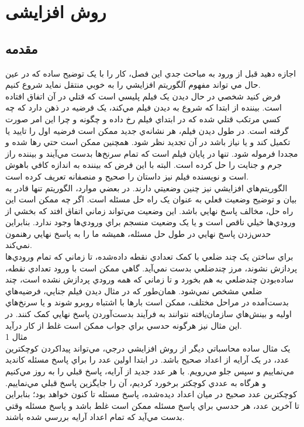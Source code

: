 \documentclass{book}
\begin{document}
\chapter{روش افزایشی
}

\section*{مقدمه}
	اجازه دهيد قبل از ورود به مباحث جدي اين فصل، کار را با يک توضيح ساده که در عين حال مي تواند مفهوم آلگوريتم افزايشي را به خوبي منتقل نمايد شروع کنيم.\\
	
	فرض کنيد شخصي در حال ديدن يک فيلم پليسي است که قتلي در آن اتفاق افتاده است. بيننده از ابتدا که شروع به ديدن فيلم مي‌کند، يک فرضيه در ذهن دارد که چه کسي مرتکب قتلي شده که در ابتداي فيلم رخ داده و چگونه و چرا اين امر صورت گرفته است. در طول ديدن فيلم، هر نشانه‌ي جديد ممکن است فرضيه اول را تاييد يا تکميل کند و يا نياز باشد در آن تجديد نظر شود. همچنين ممکن است حتي رها شده و مجددا فرموله شود. تنها در پايان فيلم است که تمام سرنخ‌ها بدست مي‌آيند و بيننده راز جرم و جنايت را حل کرده است. البته با اين فرض که بيننده به اندازه کافي باهوش است و نويسنده فيلم نيز  داستان را صحيح و منصفانه تعريف کرده است. \\
	
	الگوريتم‌هاي افزايشي نيز چنين وضعيتي دارند. در بعضي موارد، الگوريتم تنها قادر به بيان و توضيح وضعيت فعلي به عنوان يک راه حل مسئله است. اگر چه ممکن است اين راه حل، مخالف پاسخ نهايي باشد. اين وضعيت مي‌تواند زماني اتفاق افتد که بخشي از ورودي‌ها خيلي ناقص است و يا يک وضعيت منسجم براي ورودي‌ها وجود ندارد. بنابراين حدس‌زدن پاسخ نهايي در طول حل مسئله، هميشه ما را به پاسخ نهايي رهنمون نمي‌کند.\\
	
	براي ساختن يک چند ضلعي با کمک تعدادي نقطه داده‌شده، تا زماني که تمام ورودي‌ها پردازش نشوند، مرز چندضلعي بدست نمي‌آيد. گاهي ممکن است با ورود تعدادي نقطه، ساده‌بودن چندضلعي به هم بخورد و تا زماني که همه ورودي پردازش نشده است، چند ضلعي مشخص نمي‌شود. همان‌طور که در مثال ديدن فيلم جنايي، فرضيه‌هاي بدست‌آمده در مراحل مختلف، ممکن است بارها با اشتباه روبرو شوند و يا سرنخ‌هاي اوليه و بينش‌هاي سازمان‌يافته نتوانند به فرآيند بدست‌آوردن پاسخ نهايي کمک کنند. در اين مثال نيز هرگونه حدسي براي جواب ممکن است غلط از کار درآيد. \\
	{مثال 1 \large}\\
	يک مثال ساده محاسباتي ديگر از روش افزايشي درجي، مي‌تواند پيداکردن کوچکترين عدد، در يک آرايه از اعداد صحيح باشد. در ابتدا اولين عدد را براي پاسخ مسئله کانديد مي‌نماييم و سپس جلو مي‌رويم. با هر عدد جديد از  آرايه، پاسخ قبلي را به روز مي‌کنيم و هرگاه به عددي کوچکتر برخورد کرديم، آن‌ را جايگزين پاسخ قبلي مي‌نماييم. کوچکترين عدد صحيح در ميان اعداد ديده‌شده، پاسخ مسئله تا کنون خواهد بود؛ بنابراين تا آخرين عدد، هر حدسي براي پاسخ مسئله ممکن است غلط باشد و پاسخ مسئله وقتي بدست مي‌آيد که تمام اعداد آرايه بررسي شده باشند.\\
	
\end{document}
